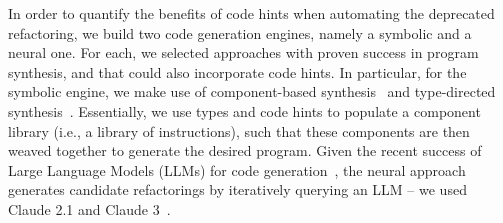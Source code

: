 \documentclass[sigconf]{acmart}
\begin{document}



In order to quantify the benefits of code hints when automating the deprecated refactoring,
we build two code generation engines, namely a symbolic and a neural one.  For each, we selected approaches with proven success in program synthesis, and that could also incorporate code hints.
%
In particular, for the symbolic engine, we make use of component-based synthesis~\cite{DBLP:conf/icse/JhaGST10,DBLP:conf/pldi/GulwaniJTV11,DBLP:conf/popl/FengM0DR17}
and type-directed synthesis~\cite{DBLP:conf/sfp/Katayama05,DBLP:conf/pldi/OseraZ15,DBLP:journals/pacmpl/YamaguchiMDW21}. Essentially, we use types and code hints to populate
a component library (i.e., a library of instructions), such that these components are then weaved together to generate the desired program.
Given the recent success of Large Language Models (LLMs) for code generation~\cite{modular,DBLP:journals/corr/abs-2302-05527,DBLP:journals/corr/abs-2202-13169,llmsforcodecompletion,codegenclasslevel,zhang2023repocoder,lostintranslation,yang2024sweagent}, the neural approach
generates candidate refactorings by iteratively querying an LLM -- we used Claude 2.1 and Claude 3~\cite{claude}.
\end{document}
